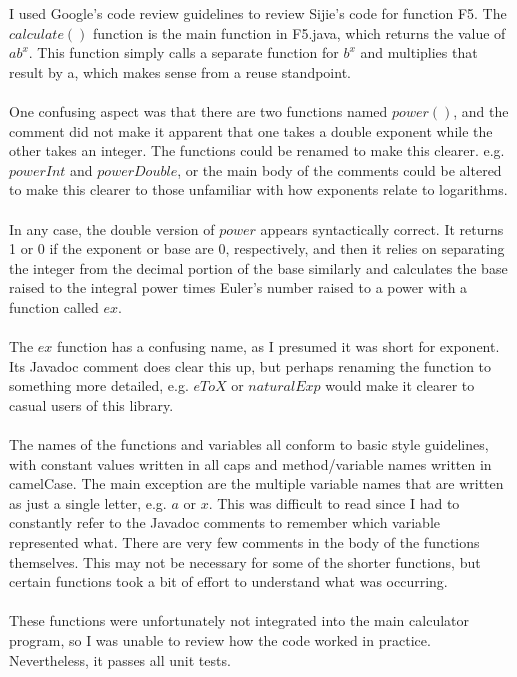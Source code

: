 \documentclass[letterpaper, 11pt]{report}
\begin{document}
I used Google's code review guidelines \cite{googleCodeReview} to review Sijie's code for function F5. The $calculate()$ function is the main function in F5.java, which returns the value of $ab^x$. This function simply calls a separate function for $b^x$ and multiplies that result by a, which makes sense from a reuse standpoint. \\\\
One confusing aspect was that there are two functions named $power()$, and the comment did not make it apparent that one takes a double exponent while the other takes an integer. The functions could be renamed to make this clearer. e.g. $powerInt$ and $powerDouble$, or the main body of the comments could be altered to make this clearer to those unfamiliar with how exponents relate to logarithms. \\\\
In any case, the double version of $power$ appears syntactically correct. It returns 1 or 0 if the exponent or base are 0, respectively, and then it relies on separating the integer from the decimal portion of the base similarly and calculates the base raised to the integral power times Euler's number raised to a power with a function called $ex$. \\\\
The $ex$ function has a confusing name, as I presumed it was short for exponent. Its Javadoc comment does clear this up, but perhaps renaming the function to something more detailed, e.g. $eToX$ or $naturalExp$ would make it clearer to casual users of this library. \\\\
The names of the functions and variables all conform to basic style guidelines, with constant values written in all caps and method/variable names written in camelCase. The main exception are the multiple variable names that are written as just a single letter, e.g. $a$ or $x$. This was difficult to read since I had to constantly refer to the Javadoc comments to remember which variable represented what. There are very few comments in the body of the functions themselves. This may not be necessary for some of the shorter functions, but certain functions took a bit of effort to understand what was occurring. \\\\
These functions were unfortunately not integrated into the main calculator program, so I was unable to review how the code worked in practice. Nevertheless, it passes all unit tests.
\end{document}
